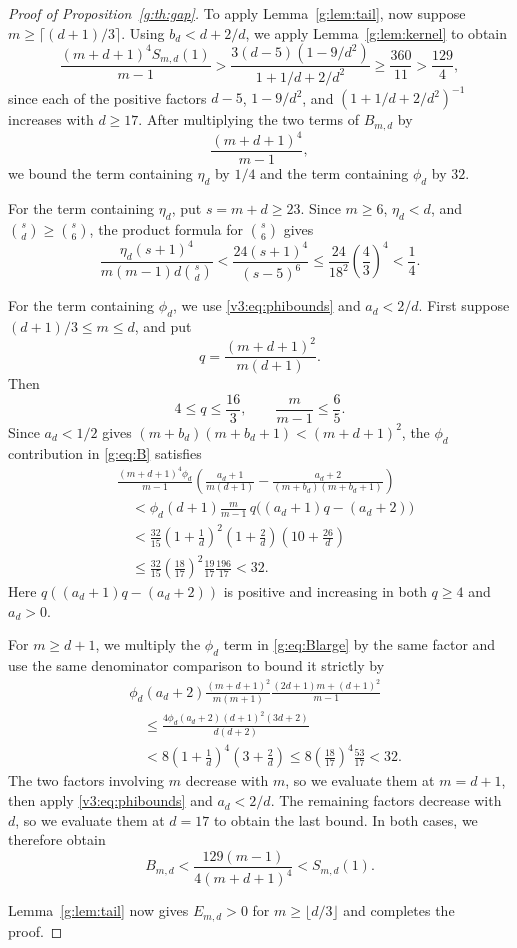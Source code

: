 \documentclass[10pt,a4paper]{article}
\numberwithin{equation}{section}
\theoremstyle{remark}\newtheorem{remark}[theorem]{Remark}
\begin{document}
\begin{proof}[Proof of Proposition~\ref{g:th:gap}]
To apply Lemma~\ref{g:lem:tail}, now suppose $m\ge\lceil(d+1)/3\rceil$.
Using $b_d<d+2/d$, we apply Lemma~\ref{g:lem:kernel} to obtain
\[
 \frac{(m+d+1)^4S_{m,d}(1)}{m-1}
 >\frac{3(d-5)(1-9/d^2)}{1+1/d+2/d^2}
 \ge\frac{360}{11}>\frac{129}{4},
\]
since each of the positive factors $d-5$, $1-9/d^2$, and
$(1+1/d+2/d^2)^{-1}$ increases with $d\ge17$.
After multiplying the two terms of $B_{m,d}$ by
\[
 \frac{(m+d+1)^4}{m-1},
\]
we bound the term containing $\eta_d$ by $1/4$ and the term containing
$\phi_d$ by $32$.

For the term containing $\eta_d$, put $s=m+d\ge23$.
Since $m\ge6$, $\eta_d<d$, and $\binom{s}{d}\ge\binom{s}{6}$,
the product formula for $\binom{s}{6}$ gives
\[
 \frac{\eta_d(s+1)^4}{m(m-1)d\binom{s}{d}}
 <\frac{24(s+1)^4}{(s-5)^6}
 \le\frac{24}{18^2}\left(\frac43\right)^4<\frac14.
\]

For the term containing $\phi_d$, we use \eqref{v3:eq:phibounds} and
$a_d<2/d$. First suppose $(d+1)/3\le m\le d$, and put
\[
 q=\frac{(m+d+1)^2}{m(d+1)}.
\]
Then
\[
 4\le q\le\frac{16}3,\qquad \frac{m}{m-1}\le\frac65.
\]
Since $a_d<1/2$ gives
$(m+b_d)(m+b_d+1)<(m+d+1)^2$, the $\phi_d$ contribution in
\eqref{g:eq:B} satisfies
\[
\begin{aligned}
 &\frac{(m+d+1)^4\phi_d}{m-1}\left(\frac{a_d+1}{m(d+1)}
       -\frac{a_d+2}{(m+b_d)(m+b_d+1)}\right)\\
 &\quad<\phi_d(d+1)\frac{m}{m-1}\,
          q\bigl((a_d+1)q-(a_d+2)\bigr)\\
 &\quad<\frac{32}{15}\left(1+\frac1d\right)^2
       \left(1+\frac2d\right)\left(10+\frac{26}d\right)\\
 &\quad\le\frac{32}{15}\left(\frac{18}{17}\right)^2
       \frac{19}{17}\frac{196}{17}<32.
\end{aligned}
\]
Here $q((a_d+1)q-(a_d+2))$ is positive and increasing in both
$q\ge4$ and $a_d>0$.

For $m\ge d+1$, we multiply the $\phi_d$ term in
\eqref{g:eq:Blarge} by the same factor and use the same denominator
comparison to bound it strictly by
\[
\begin{aligned}
 &\phi_d(a_d+2)\frac{(m+d+1)^2}{m(m+1)}
 \frac{(2d+1)m+(d+1)^2}{m-1}\\
 &\quad\le\frac{4\phi_d(a_d+2)(d+1)^2(3d+2)}{d(d+2)}\\
 &\quad<8\left(1+\frac1d\right)^4\left(3+\frac2d\right)
 \le8\left(\frac{18}{17}\right)^4\frac{53}{17}<32.
\end{aligned}
\]
The two factors involving $m$ decrease with $m$, so we evaluate them
at $m=d+1$, then apply \eqref{v3:eq:phibounds} and $a_d<2/d$.
The remaining factors decrease with $d$, so we evaluate them at $d=17$
to obtain the last bound.
In both cases, we therefore obtain
\[
 B_{m,d}<\frac{129(m-1)}{4(m+d+1)^4}<S_{m,d}(1).
\]

Lemma~\ref{g:lem:tail} now gives $E_{m,d}>0$ for
$m\ge\lfloor d/3\rfloor$ and completes the proof.
\end{proof}
\end{document}
